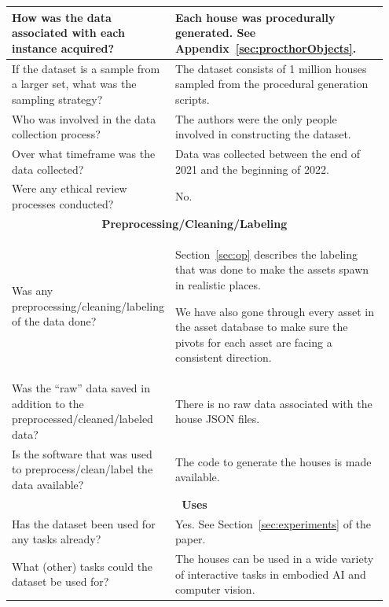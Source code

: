\begin{longtable}{p{0.35\linewidth} |p{0.6\linewidth} }
    \toprule
    How was the data associated with each instance acquired? & Each house was procedurally generated. See Appendix~\ref{sec:procthorObjects}.\\[0.15in]
    \midrule
    If the dataset is a sample from a larger set, what was the sampling strategy? & The dataset consists of 1 million houses sampled from the procedural generation scripts.\\[0.15in]
    \midrule
    Who was involved in the data collection process? & The authors were the only people involved in constructing the dataset.\\[0.15in]
    \midrule
    Over what timeframe was the data collected? & Data was collected between the end of 2021 and the beginning of 2022.\\[0.15in]
    \midrule
    Were any ethical review processes conducted? & No.\\
    \bottomrule
        \multicolumn{2}{c}{\rule{0in}{0.2in}\textbf{Preprocessing/Cleaning/Labeling}\vspace{0.10in}}\\
    \toprule
    Was any preprocessing/cleaning/labeling of the data done? & Section~\ref{sec:op} describes the labeling that was done to make the assets spawn in realistic places.\newline
    
    We have also gone through every asset in the asset database to make sure the pivots for each asset are facing a consistent direction.\\[0.15in]
    \midrule
    Was the ``raw'' data saved in addition to the preprocessed/cleaned/labeled data? & There is no raw data associated with the house JSON files.\\[0.15in]
    \midrule
    Is the software that was used to preprocess/clean/label the data available? & The code to generate the houses is made available.\\
    \bottomrule
        \multicolumn{2}{c}{\rule{0in}{0.2in}\textbf{Uses}\vspace{0.10in}}\\
    \toprule
    Has the dataset been used for any tasks already? & Yes. See Section~\ref{sec:experiments} of the paper.\\[0.15in]
    \midrule
    What (other) tasks could the dataset be used for? & The houses can be used in a wide variety of interactive tasks in embodied AI and computer vision.\newline


\end{longtable}
